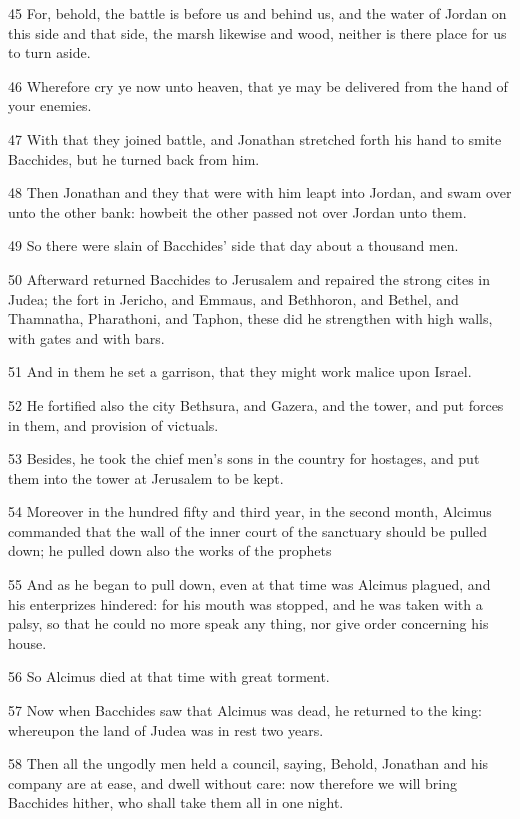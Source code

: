 \par 45 For, behold, the battle is before us and behind us, and the water of Jordan on this side and that side, the marsh likewise and wood, neither is there place for us to turn aside.
\par 46 Wherefore cry ye now unto heaven, that ye may be delivered from the hand of your enemies.
\par 47 With that they joined battle, and Jonathan stretched forth his hand to smite Bacchides, but he turned back from him.
\par 48 Then Jonathan and they that were with him leapt into Jordan, and swam over unto the other bank: howbeit the other passed not over Jordan unto them.
\par 49 So there were slain of Bacchides' side that day about a thousand men.
\par 50 Afterward returned Bacchides to Jerusalem and repaired the strong cites in Judea; the fort in Jericho, and Emmaus, and Bethhoron, and Bethel, and Thamnatha, Pharathoni, and Taphon, these did he strengthen with high walls, with gates and with bars.
\par 51 And in them he set a garrison, that they might work malice upon Israel.
\par 52 He fortified also the city Bethsura, and Gazera, and the tower, and put forces in them, and provision of victuals.
\par 53 Besides, he took the chief men's sons in the country for hostages, and put them into the tower at Jerusalem to be kept.
\par 54 Moreover in the hundred fifty and third year, in the second month, Alcimus commanded that the wall of the inner court of the sanctuary should be pulled down; he pulled down also the works of the prophets
\par 55 And as he began to pull down, even at that time was Alcimus plagued, and his enterprizes hindered: for his mouth was stopped, and he was taken with a palsy, so that he could no more speak any thing, nor give order concerning his house.
\par 56 So Alcimus died at that time with great torment.
\par 57 Now when Bacchides saw that Alcimus was dead, he returned to the king: whereupon the land of Judea was in rest two years.
\par 58 Then all the ungodly men held a council, saying, Behold, Jonathan and his company are at ease, and dwell without care: now therefore we will bring Bacchides hither, who shall take them all in one night.
